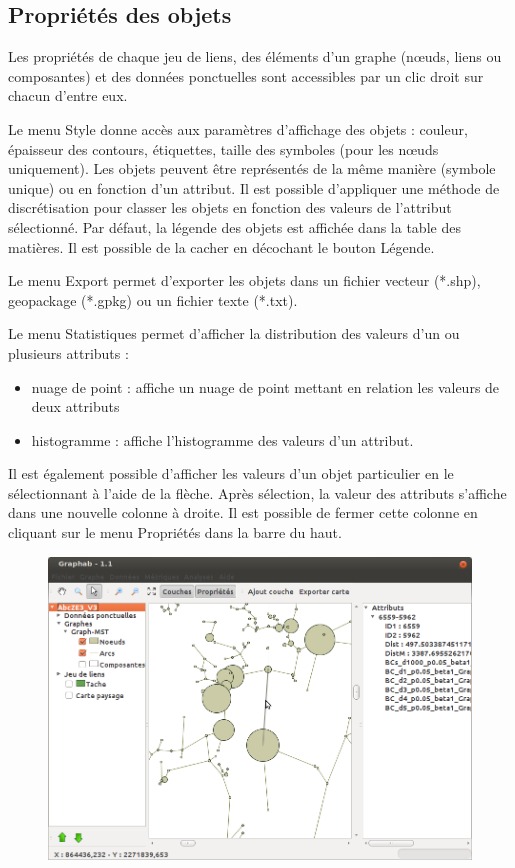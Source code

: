 \documentclass{article}
\begin{document}
\subsection{Propriétés des objets}
\label{properties}
Les propriétés de chaque jeu de liens, des éléments d’un graphe (nœuds, liens ou composantes) et des données ponctuelles sont accessibles par un clic droit sur chacun d’entre eux.

Le menu Style donne accès aux paramètres d’affichage des objets : couleur, épaisseur des contours, étiquettes, taille des symboles (pour les nœuds uniquement). Les objets peuvent être représentés de la même manière (symbole unique) ou en fonction d’un attribut. Il est possible d’appliquer une méthode de discrétisation pour classer les objets en fonction des valeurs de l’attribut sélectionné. Par défaut, la légende des objets est affichée dans la table des matières. Il est possible de la cacher en décochant le bouton Légende.

Le menu Export permet d’exporter les objets dans un fichier vecteur (*.shp), geopackage (*.gpkg) ou un fichier texte (*.txt).

Le menu Statistiques permet d’afficher la distribution des valeurs d’un ou plusieurs attributs : 
\begin{itemize}
	\item nuage de point : affiche un nuage de point mettant en relation les valeurs de deux attributs
	\item histogramme : affiche l’histogramme des valeurs d’un attribut.
\end{itemize}

Il est également possible d’afficher les valeurs d’un objet particulier en le sélectionnant à l’aide de la flèche. Après sélection, la valeur des attributs s’affiche dans une nouvelle colonne à droite. Il est possible de fermer cette colonne en cliquant sur le menu  Propriétés dans la barre du haut.

\begin{figure}[H]
	\includegraphics[scale=0.5]{img/manual-fr_img19.png} 
\end{figure}
\end{document}
